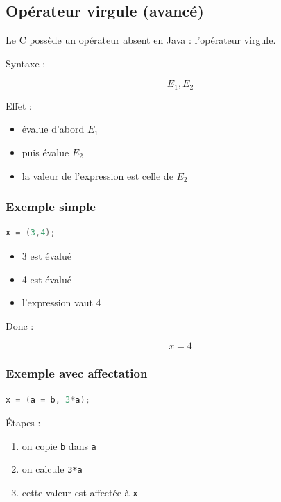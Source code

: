\subsection{Opérateur virgule (avancé)}

Le C possède un opérateur absent en Java : l’opérateur virgule.

Syntaxe :

\[
E_1 , E_2
\]

Effet :

\begin{itemize}
    \item évalue d’abord \(E_1\)
    \item puis évalue \(E_2\)
    \item la valeur de l’expression est celle de \(E_2\)
\end{itemize}

\subsubsection{Exemple simple}

\begin{lstlisting}[language=C]
x = (3,4);
\end{lstlisting}

\begin{itemize}
    \item 3 est évalué
    \item 4 est évalué
    \item l’expression vaut 4
\end{itemize}

Donc :

\[
x = 4
\]

\subsubsection{Exemple avec affectation}

\begin{lstlisting}[language=C]
x = (a = b, 3*a);
\end{lstlisting}

Étapes :

\begin{enumerate}
    \item on copie \texttt{b} dans \texttt{a}
    \item on calcule \texttt{3*a}
    \item cette valeur est affectée à \texttt{x}
\end{enumerate}


